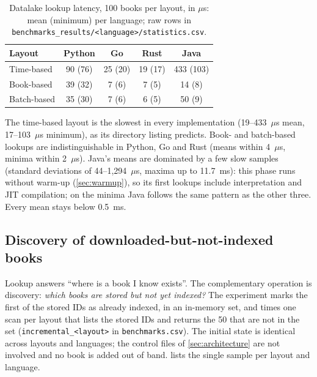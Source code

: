 \begin{table}[htbp]
    \centering
    \caption{Datalake lookup latency, 100 books per layout, in $\mu$s: mean
    (minimum) per language; raw rows in
    \texttt{benchmarks\_results/<language>/statistics.csv}.}
    \label{tab:datalake-lookup}
    \begin{tabular}{@{}lcccc@{}}
        \toprule
        Layout & Python & Go & Rust & Java \\
        \midrule
        Time-based & 90 (76) & 25 (20) & 19 (17) & 433 (103) \\
        Book-based & 39 (32) & 7 (6) & 7 (5) & 14 (8) \\
        Batch-based & 35 (30) & 7 (6) & 6 (5) & 50 (9) \\
        \bottomrule
    \end{tabular}
\end{table}

The time-based layout is the slowest in every implementation (19--433~$\mu$s
mean, 17--103~$\mu$s minimum), as its directory listing predicts. Book- and
batch-based lookups are indistinguishable in Python, Go and Rust (means
within 4~$\mu$s, minima within 2~$\mu$s). Java's means are dominated by a few
slow samples (standard deviations of 44--1{,}294~$\mu$s, maxima up to
11.7~ms): this phase runs without warm-up (\cref{sec:warmup}), so its first
lookups include interpretation and JIT compilation; on the minima Java
follows the same pattern as the other three. Every mean stays below
0.5~ms.

\subsection{Discovery of downloaded-but-not-indexed books}
\label{sec:datalake-discovery}

Lookup answers ``where is a book I know exists''. The complementary
operation is discovery: \emph{which books are stored but not yet indexed?}
The experiment marks the first  of the  stored IDs as
already indexed, in an in-memory set, and times one scan per layout that
lists the stored IDs and returns the 50 that are not in the set
(\texttt{incremental\_<layout>} in \texttt{benchmarks.csv}). The initial
state is identical across layouts and languages; the control files of
\cref{sec:architecture} are not involved and no book is added out of band.
 lists the single sample per layout and language.

